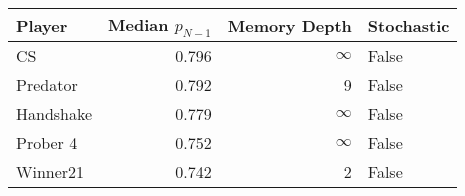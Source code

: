 \begin{tabular}{lrrl}
\toprule
    Player &  Median $p_{N-1}$ &  Memory Depth & Stochastic \\
\midrule
        CS &             0.796 &            \(\infty\) &      False \\
  Predator &             0.792 &             9 &      False \\
 Handshake &             0.779 &            \(\infty\) &      False \\
  Prober 4 &             0.752 &            \(\infty\) &      False \\
  Winner21 &             0.742 &             2 &      False \\
\bottomrule
\end{tabular}

